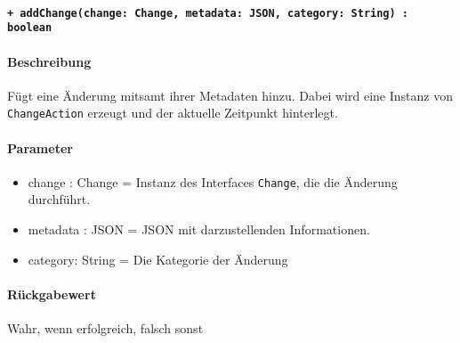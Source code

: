 \paragraph{\texttt{+ addChange(change: Change, metadata: JSON, category: String) : boolean}}%
\paragraph*{Beschreibung}
Fügt eine Änderung mitsamt ihrer Metadaten hinzu.
Dabei wird eine Instanz von \verb#ChangeAction# erzeugt und der aktuelle Zeitpunkt hinterlegt.
\paragraph*{Parameter}
\begin{itemize}
    \item change : Change = Instanz des Interfaces \verb#Change#, die die Änderung durchführt.
    \item metadata : JSON = JSON mit darzustellenden Informationen.
    \item category: String = Die Kategorie der Änderung
\end{itemize}
\paragraph*{Rückgabewert}
Wahr, wenn erfolgreich, falsch sonst
